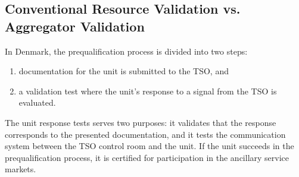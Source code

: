 \subsection{Conventional Resource Validation vs. Aggregator Validation}\label{subsec:backgroundvalidation}
In Denmark, the prequalification process is divided into two steps:
\begin{enumerate}
	\item documentation for the unit is submitted to the TSO, and
	\item a validation test where the unit's response to a signal from the TSO is evaluated.
\end{enumerate}

The unit response tests serves two purposes: it validates that the response corresponds to the presented documentation, and it tests the communication system between the TSO control room and the unit. If the unit succeeds in the prequalification process, it is certified for participation in the ancillary service markets.


